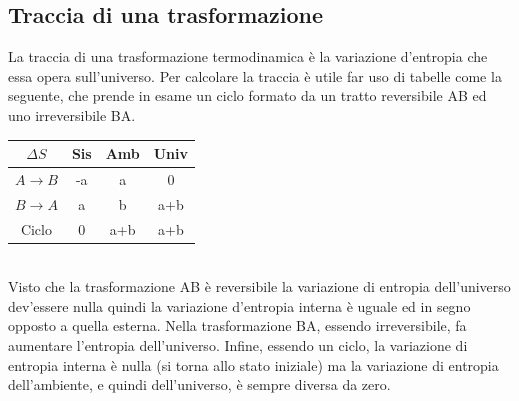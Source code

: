 \documentclass[10pt,a4paper]{article}
\begin{document}
\subsection{Traccia di una trasformazione}
La traccia di una trasformazione termodinamica è la variazione d'entropia che essa opera sull'universo. Per calcolare la traccia è utile far uso di tabelle come la seguente, che prende in esame un ciclo formato da un tratto reversibile AB ed uno irreversibile BA. 
\begin{table}[h!]
	\begin{center}
		\begin{tabular}{ || c| c | c| c|| }
			\hline
			\(\Delta S\) & Sis& Amb& Univ\\
			\hline
		\(A\rightarrow B\)& -a   &a  &0  \\
		\(B\rightarrow A\)& a    &b   &a+b\\
		\hline
			Ciclo         & 0    &a+b &a+b \\
			\hline
		\end{tabular}
	\end{center}
\end{table}\\
Visto che la trasformazione AB è reversibile la variazione di entropia dell'universo dev'essere nulla quindi la variazione d'entropia interna è uguale ed in segno opposto a quella esterna. Nella trasformazione BA, essendo irreversibile, fa aumentare l'entropia dell'universo. Infine, essendo un ciclo, la variazione di entropia interna è nulla (si torna allo stato iniziale) ma la variazione di entropia dell'ambiente, e quindi dell'universo, è sempre diversa da zero. 
\end{document}
